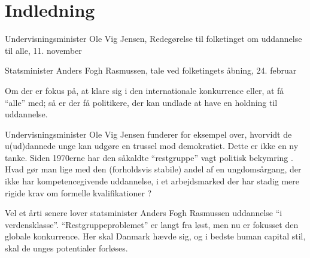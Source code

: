 \section{Indledning}\label{sec:intro}
\begin{epigraphs}
{Undervisningsminister Ole Vig Jensen, Redegørelse til folketinget om uddannelse til alle, 11. november \citeyear{jensenRedegorelseR319931993}}

{Statsminister Anders Fogh Rasmussen, tale ved folketingets åbning, 24. februar \citeyear{rasmussenStatsministerAndersFogh2005}}
\end{epigraphs}

 Om der er fokus på, at klare sig i den internationale konkurrence eller, at få “alle” med; så er der få politikere, der kan undlade at have en holdning til uddannelse.

Undervisningsminister Ole Vig Jensen funderer for eksempel over, hvorvidt de u(ud)dannede unge kan udgøre en trussel mod demokratiet.
Dette er ikke en ny tanke. Siden 1970erne har den såkaldte “restgruppe” vagt politisk bekymring \autocite{hansenRestgruppen2004}.
Hvad gør man lige med den (forholdsvis stabile) andel af en ungdomsårgang, der ikke har kompetencegivende uddannelse, i et arbejdsmarked der har stadig mere rigide krav om formelle kvalifikationer \autocite{dpuNyhedsbrevUddannelseKan2001}?

 Vel et årti senere lover statsminister Anders Fogh Rasmussen uddannelse “i verdensklasse”. “Restgruppeproblemet” er langt fra løst, men nu er fokusset den globale konkurrence.
 Her skal Danmark hævde sig, og i bedste human capital stil, skal de unges potentialer forløses.

